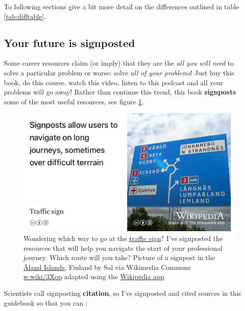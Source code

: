 \documentclass[
]{book}
\begin{document}
To following sections give a bit more detail on the differences outlined in table \ref{tab:difftable}.

\hypertarget{signposted}{%
\subsection{Your future is signposted}\label{signposted}}

Some career resources claim (or imply) that they are the \emph{all you will need} to solve a particular problem or worse: solve \emph{all of your problems}! Just buy this book, do this course, watch this video, listen to this podcast and all your problems will go away! Rather than continue this trend, this book \textbf{signposts} some of the most useful resources, see figure \ref{fig:signposting-fig}.

\begin{figure}

{\centering \includegraphics[width=1\linewidth]{images/signposting} 

}

\caption{Wondering which way to go at the \href{https://en.wikipedia.org/wiki/Traffic_sign}{traffic sign}? I've signposted the resources that will help you navigate the start of your professional journey. Which route will you take? Picture of a signpost in the \href{https://en.wikipedia.org/wiki/\%C3\%85land_Islands}{Åland Islands}, Finland by Sal via Wikimedia Commons \href{https://w.wiki/3Xop}{w.wiki/3Xop} adapted using the \href{https://apps.apple.com/us/app/wikipedia/id324715238}{Wikipedia app}}\label{fig:signposting-fig}
\end{figure}



Scientists call signposting \textbf{citation}, so I've signposted and cited sources in this guidebook so that you can :
\end{document}
